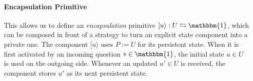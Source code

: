 \documentclass[acmsmall,screen,review,nonacm]{acmart}
\newcommand{\kw}[1]{\ensuremath{ \mathsf{#1} }}
\newcommand{\lensarrow}{\leftrightarrows}
\begin{document}
%

\paragraph{Encapsulation Primitive} %

This allows us to define an \emph{encapsulation} primitive
$[ u \rangle : U \lensarrow \mathbbm{1}$,
which can be composed in front of a strategy
to turn an explicit state component into a private one.
The component $[u\rangle$ uses $P := U$ for its persistent state.
When it is first activated
by an incoming question $* \in \mathbbm{1}$,
the initial state $u \in U$ is used on the outgoing side.
Whenever an updated $u' \in U$ is received,
the component stores $u'$ as its next persistent state.



\end{document}
